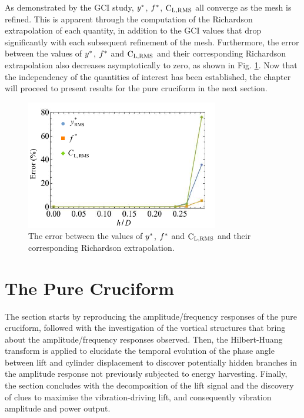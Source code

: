 \documentclass[oneside]{utmthesis}
\begin{document}
As demonstrated by the GCI study, $y^{*}$, $f^{*}$, $\text{C}_{\text{L,RMS}}$ all converge as the mesh is refined. This is apparent through the computation of the Richardson extrapolation of each quantity, in addition to the GCI values that drop significantly with each subsequent refinement of the mesh. Furthermore, the error between the values of $y^{*}$, $f^{*}$ and $\text{C}_{\text{L,RMS}}$ and their corresponding Richardson extrapolation also decreases asymptotically to zero, as shown in Fig. \ref{fig:richardsonError}. Now that the independency of the quantities of interest has been established, the chapter will proceed to present results for the pure cruciform in the next section.

\begin{figure}[!h]
  \centering
  \hspace{1cm} \includegraphics[width=0.75\textwidth]{figs/richardsonError}
  \caption{The error between the values of $y^{*}$, $f^{*}$ and $\text{C}_{\text{L,RMS}}$ and their corresponding Richardson extrapolation.}
  \label{fig:richardsonError}
\end{figure}

\section{The Pure Cruciform}\label{sec:svivRegime}

\vspace{\baselineskip}

The section starts by reproducing the amplitude/frequency responses of the pure cruciform, followed with the investigation of the vortical structures that bring about the amplitude/frequency responses observed. Then, the Hilbert-Huang transform is applied to elucidate the temporal evolution of the phase angle between lift and cylinder displacement to discover potentially hidden branches in the amplitude response not previously subjected to energy harvesting. Finally, the section concludes with the decomposition of the lift signal and the discovery of clues to maximise the vibration-driving lift, and consequently vibration amplitude and power output.
\end{document}
